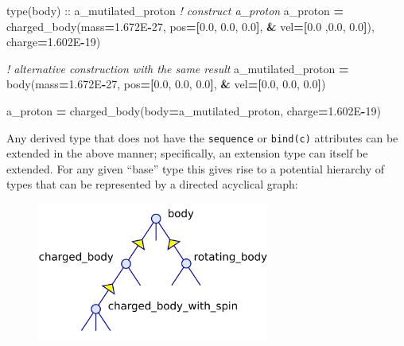 \documentclass[
  paper=a4,
  ,captions=tableheading
]{scrartcl}
\newenvironment{Shaded}{\begin{snugshade}}{\end{snugshade}}
\newcommand{\CommentTok}[1]{\textcolor[rgb]{0.56,0.35,0.01}{\textit{#1}}}
\newcommand{\DataTypeTok}[1]{\textcolor[rgb]{0.13,0.29,0.53}{#1}}
\newcommand{\DecValTok}[1]{\textcolor[rgb]{0.00,0.00,0.81}{#1}}
\newcommand{\FloatTok}[1]{\textcolor[rgb]{0.00,0.00,0.81}{#1}}
\newcommand{\KeywordTok}[1]{\textcolor[rgb]{0.13,0.29,0.53}{\textbf{#1}}}
\newcommand{\NormalTok}[1]{#1}
\begin{document}
\begin{Shaded}
\begin{Highlighting}[]
\DataTypeTok{type(body)} \DataTypeTok{::}\NormalTok{ a\_mutilated\_proton}
\CommentTok{! construct a\_proton}
\NormalTok{a\_proton }\KeywordTok{=}\NormalTok{ charged\_body(mass}\KeywordTok{=}\FloatTok{1.672}\NormalTok{E}\KeywordTok{{-}}\DecValTok{27}\NormalTok{, pos}\KeywordTok{=[}\FloatTok{0.0}\NormalTok{, }\FloatTok{0.0}\NormalTok{, }\FloatTok{0.0}\KeywordTok{]}\NormalTok{, }\KeywordTok{\&}
\NormalTok{                        vel}\KeywordTok{=[}\FloatTok{0.0}\NormalTok{ ,}\FloatTok{0.0}\NormalTok{, }\FloatTok{0.0}\KeywordTok{]}\NormalTok{), charge}\KeywordTok{=}\FloatTok{1.602}\NormalTok{E}\KeywordTok{{-}}\DecValTok{19}\NormalTok{)}

\CommentTok{! alternative construction with the same result}
\NormalTok{a\_mutilated\_proton }\KeywordTok{=}\NormalTok{ body(mass}\KeywordTok{=}\FloatTok{1.672}\NormalTok{E}\KeywordTok{{-}}\DecValTok{27}\NormalTok{, pos}\KeywordTok{=[}\FloatTok{0.0}\NormalTok{, }\FloatTok{0.0}\NormalTok{, }\FloatTok{0.0}\KeywordTok{]}\NormalTok{, }\KeywordTok{\&}
\NormalTok{                          vel}\KeywordTok{=[}\FloatTok{0.0}\NormalTok{, }\FloatTok{0.0}\NormalTok{, }\FloatTok{0.0}\KeywordTok{]}\NormalTok{)}

\NormalTok{a\_proton }\KeywordTok{=}\NormalTok{ charged\_body(body}\KeywordTok{=}\NormalTok{a\_mutilated\_proton, charge}\KeywordTok{=}\FloatTok{1.602}\NormalTok{E}\KeywordTok{{-}}\DecValTok{19}\NormalTok{)}
\end{Highlighting}
\end{Shaded}

Any derived type that does not have the \texttt{sequence} or
\texttt{bind(c)} attributes can be extended in the above manner;
specifically, an extension type can itself be extended. For any given
``base'' type this gives rise to a potential hierarchy of types that can
be represented by a directed acyclical graph:

\begin{figure}
\centering
\includegraphics[width=3in,height=\textheight,keepaspectratio]{./images/Inheritance_diagram.png}
\caption{~}
\end{figure}
\end{document}
